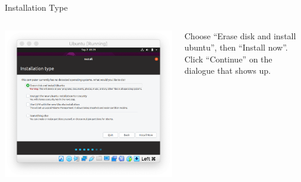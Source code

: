 \documentclass[12pt]{beamer}
\begin{document}
\begin{frame}{Installation Type}
  \begin{columns}
    \begin{column}{0.65\linewidth}
      \includegraphics[width=\linewidth]{ubuntu-disk}
    \end{column}
    \begin{column}{0.35\linewidth}
      Choose ``Erase disk and install ubuntu'', then ``Install now''. Click ``Continue'' on the dialogue that shows up.
    \end{column}
  \end{columns}
\end{frame}
\end{document}
